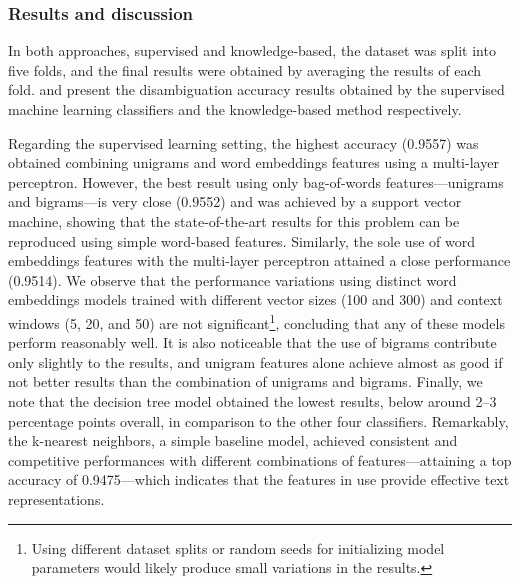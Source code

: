 \subsubsection{Results and discussion}

In both approaches, supervised and knowledge-based, the dataset was split into five folds, and the final results were obtained by averaging the results of each fold.
 and  present the disambiguation accuracy results obtained by the supervised machine learning classifiers and the knowledge-based method respectively.

Regarding the supervised learning setting, the highest accuracy (0.9557) was obtained combining unigrams and word embeddings features using a multi-layer perceptron.
However, the best result using only bag-of-words features---unigrams and bigrams---is very close (0.9552) and was achieved by a support vector machine, showing that the state-of-the-art results for this problem can be reproduced using simple word-based features.
Similarly, the sole use of word embeddings features with the multi-layer perceptron attained a close performance (0.9514).
We observe that the performance variations using distinct word embeddings models trained with different vector sizes (100 and 300) and context windows (5, 20, and 50) are not significant\footnote{Using different dataset splits or random seeds for initializing model parameters would likely produce small variations in the results.}, concluding that any of these models perform reasonably well.
It is also noticeable that the use of bigrams contribute only slightly to the results, and unigram features alone achieve almost as good if not better results than the combination of unigrams and bigrams.
Finally, we note that the decision tree model obtained the lowest results, below around 2--3 percentage points overall, in comparison to the other four classifiers.
Remarkably, the k-nearest neighbors, a simple baseline model, achieved consistent and competitive performances with different combinations of features---attaining a top accuracy of 0.9475---which indicates that the features in use provide effective text representations.






